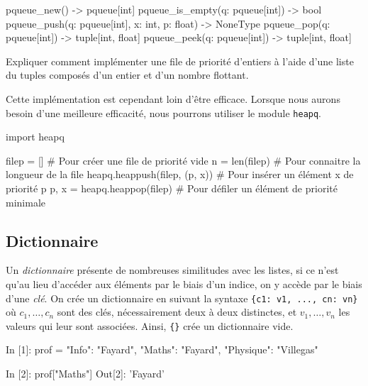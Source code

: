 \documentclass{magnoliaold}
\begin{document}
\begin{pythoncode}
pqueue_new() -> pqueue[int]
pqueue_is_empty(q: pqueue[int]) -> bool
pqueue_push(q: pqueue[int], x: int, p: float) -> NoneType
pqueue_pop(q: pqueue[int]) -> tuple[int, float]
pqueue_peek(q: pqueue[int]) -> tuple[int, float]
\end{pythoncode}

\begin{exoUnique}
\exo Expliquer comment implémenter une file de priorité d'entiers à l'aide d'une liste
  du tuples composés d'un entier et d'un nombre flottant.
\end{exoUnique}

\vspace{2ex}
Cette implémentation est cependant loin d'être efficace. Lorsque nous aurons besoin
d'une meilleure efficacité, nous pourrons utiliser le module \verb!heapq!.

\begin{pythoncode}
import heapq

filep = []                    # Pour créer une file de priorité vide
n = len(filep)                # Pour connaitre la longueur de la file
heapq.heappush(filep, (p, x)) # Pour insérer un élément x de priorité p
p, x = heapq.heappop(filep)   # Pour défiler un élément de priorité minimale
\end{pythoncode}

\subsection{Dictionnaire}

Un \emph{dictionnaire} présente de nombreuses similitudes avec les listes, si ce n'est qu'au lieu d'accéder aux éléments
par le biais d'un indice, on y accède par le biais d'une \emph{clé}. On crée un dictionnaire en suivant la
syntaxe \verb!{c1: v1, ..., cn: vn}! où $c_1,\ldots,c_n$ sont des clés, nécessairement deux à deux
distinctes, et $v_1,\ldots,v_n$ les valeurs qui leur sont associées. Ainsi, \verb!{}! crée un dictionnaire
vide.

\begin{pythoncode}
In [1]: prof = {"Info": "Fayard", "Maths": "Fayard", "Physique": "Villegas"}

In [2]: prof["Maths"]
Out[2]: 'Fayard'
\end{pythoncode}
\end{document}
